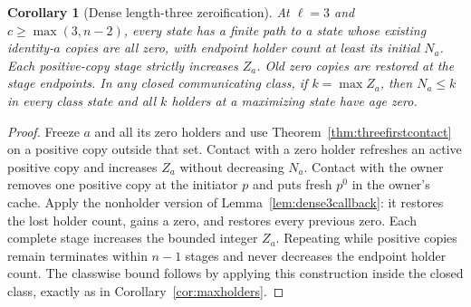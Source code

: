 \documentclass[11pt]{article}
\newtheorem{corollary}[theorem]{Corollary}
\begin{document}
\begin{corollary}[Dense length-three zeroification]
\label{cor:dense3zeroify}
At $\ell=3$ and $c\ge\max(3,n-2)$, every state has a finite path
to a state whose existing identity-$a$ copies are all zero, with
endpoint holder count at least its initial $N_a$.
Each positive-copy stage strictly increases $Z_a$.
Old zero copies are restored at the stage endpoints.
In any closed communicating class, if $k=\max Z_a$, then
$N_a\le k$ in every class state and all $k$ holders at a
maximizing state have age zero.
\end{corollary}
\begin{proof}
Freeze $a$ and all its zero holders and use
Theorem~\ref{thm:threefirstcontact} on a positive copy outside that set.
Contact with a zero holder refreshes an active positive copy and
increases $Z_a$ without decreasing $N_a$.
Contact with the owner removes one positive copy at the initiator
$p$ and puts fresh $p^0$ in the owner's cache. Apply the
nonholder version of Lemma~\ref{lem:dense3callback}: it restores the
lost holder count, gains a zero, and restores every previous zero.
Each complete stage increases the bounded integer $Z_a$.
Repeating while positive copies remain terminates within $n-1$
stages and never decreases the endpoint holder count.
The classwise bound follows by applying this construction inside
the closed class, exactly as in Corollary~\ref{cor:maxholders}.
\end{proof}
\end{document}
